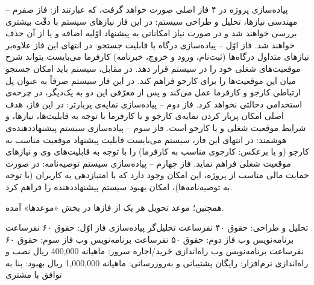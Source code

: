 پیاده‌سازی پروژه در ۴ فاز اصلی صورت خواهد گرفت، که عبارتند از:
 فاز صفرم -- مهندسی نیازها، تحلیل و طراحی سیستم: در این فاز نیازهای سیستم با دقّت بیشتری بررسی خواهند شد و در صورت نیاز امکاناتی به پیشنهاد اوّلیه اضافه و یا از آن حذف خواهند شد.
 فاز اوّل -- پیاده‌سازی درگاه با قابلیت جستجو: در انتهای این فاز علاوه‌بر نیازهای متداول درگاه‌ها (ثبت‌نام، ورود و خروج، خبرنامه) کارفرما می‌بایست بتواند شرح موقعیت‌های شغلی خود را در سیستم قرار دهد. در مقابل، سیستم باید امکان جستجو میان این موقعیت‌‌ها را برای کارجو فراهم کند. در این فاز سیستم صرفاً به عنوان پل ارتباطی کارجو و کارفرما عمل می‌کند و پس از معرّفی این دو به یک‌دیگر، در چرخه‌ی استخدامی دخالتی نخواهد کرد.
 فاز دوم -- پیاده‌سازی نمایه‌ی پربارتر: در این فاز، هدف اصلی امکان پربار کردن نمایه‌ی کارجو و یا کارفرما با توجه به قابلیت‌ها، نیازها، و شرایط موقعیت شغلی و یا کارجو است.
 فاز سوم -- پیاده‌سازی سیستم پیشنهاددهنده‌ی هوشمند: در انتهای این فاز، سیستم می‌بایست قابلیت پیشنهاد موقعیت مناسب به کارجو (و یا برعکس: کارجوی مناسب به کارفرما) را با توجه به قابلیت‌های وی و نیازهای موقعیت شغلی فراهم نماید.
 فاز چهارم -- پیاده‌سازی سیستم توصیه‌نامه: در صورت حمایت مالی مناسب از پروژه، این امکان وجود دارد که با امتیازدهی به کاربران (با توجه به توصیه‌نامه‌ها)، امکان بهبود سیستم پیشنهاددهنده را فراهم کرد.

همچنین؛ موعد تحویل هر یک از فازها در بخش «موعدها» آمده. 

 تحلیل و طراحی: حقوق ۴۰ نفرساعت تحلیل‌گر
 پیاده‌سازی
 فاز اوّل: حقوق ۶۰ نفرساعت برنامه‌نویس وب
 فاز دوم: حقوق ۵۰ نفرساعت برنامه‌نویس وب
 فاز سوم: حقوق ۶۰ نفرساعت برنامه‌نویس وب
 راه‌اندازی
 خرید/اجاره سرور: ماهیانه 400,000 ریال
 نصب و راه‌اندازی نرم‌افزار: رایگان
 پشتیبانی و به‌روزرسانی: ماهیانه 1,000,000 ریال
 بهبود: بنا به توافق با مشتری
